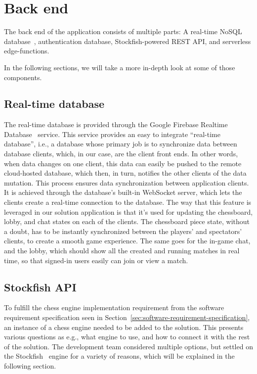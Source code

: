 \section{Back end}\label{sec:backend}

The back end of the application consists of multiple parts: A real-time NoSQL database~\cite{nosql}, authentication
database, Stockfish-powered REST API, and serverless edge-functions.

In the following sections, we will take a more in-depth look at some of those components.

\subsection{Real-time database}\label{subsec:real-time-database}

The real-time database is provided through the Google Firebase Realtime Database~\cite{realtime-database} service.
This service provides an easy to integrate ``real-time database'', i.e., a database whose primary job is to synchronize
data between database clients, which, in our case, are the client front ends.
In other words, when data changes on one client, this data can easily be pushed to the remote cloud-hosted database,
which then, in turn, notifies the other clients of the data mutation.
This process ensures data synchronization between application clients.
It is achieved through the database's built-in WebSocket server, which lets the clients create a real-time connection
to the database.
The way that this feature is leveraged in our solution application is that it's used for updating the chessboard, lobby,
and chat states on each of the clients.
The chessboard piece state, without a doubt, has to be instantly synchronized between the players' and spectators'
clients, to create a smooth game experience.
The same goes for the in-game chat, and the lobby, which should show all the created and running matches in real time,
so that signed-in users easily can join or view a match.

\subsection{Stockfish API}\label{subsec:stockfish-api}

To fulfill the chess engine implementation requirement from the software requirement specification seen in
Section~\ref{sec:software-requirement-specification}, an instance of a chess engine needed to be added to the solution.
This presents various questions as e.g., what engine to use, and how to connect it with the rest of the solution.
The development team considered multiple options,
but settled on the Stockfish~\cite{stockfish} engine for a variety of reasons, which will be explained in the following
section.

